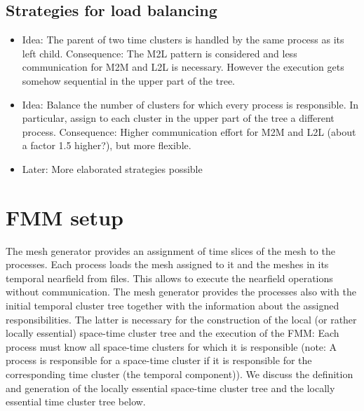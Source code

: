 \documentclass[a4paper,11pt]{article}
\theoremstyle{plain}
\theoremstyle{definition}
\theoremstyle{remark}
\begin{document}
\subsection{Strategies for load balancing}

\begin{itemize}
  \item Idea: The parent of two time clusters is handled by the same process as its left child. Consequence: The 
  M2L pattern is considered and less communication for M2M and L2L is necessary. However the execution gets 
  somehow sequential in the upper part of the tree.
  \item Idea: Balance the number of clusters for which every process is responsible. In particular, assign to 
  each cluster in the upper part of the tree a different process. Consequence: Higher communication effort for 
  M2M and L2L (about a factor 1.5 higher?), but more flexible.
  \item Later: More elaborated strategies possible
\end{itemize}

\section{FMM setup}
The mesh generator provides an assignment of time slices of the mesh to the processes. Each process loads the mesh assigned to it and the meshes in its temporal nearfield from files. This allows to execute the nearfield operations without communication. The mesh generator provides the processes also with the initial temporal cluster tree together with the information about the assigned responsibilities. The latter is necessary for the construction of the local (or rather locally essential) space-time cluster tree and the execution of the FMM: Each process must know all space-time clusters for which it is responsible (note: A process is responsible for a space-time cluster if it is responsible for the corresponding time cluster (the temporal component)). We discuss the definition and generation of the locally essential space-time cluster tree and the locally essential time cluster tree below.
\end{document}

